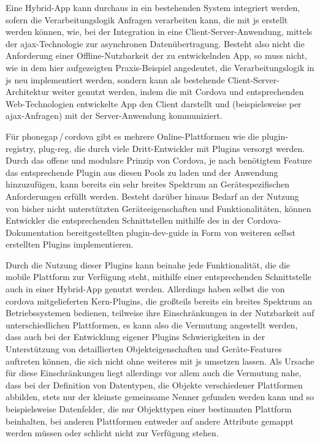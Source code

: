 
Eine Hybrid-App kann durchaus in ein bestehenden System integriert werden, sofern die Verarbeitungslogik Anfragen verarbeiten kann, die mit \gls{js} erstellt werden können, wie, \zB bei der Integration in eine Client-Server-Anwendung, mittels der \gls{ajax}-Technologie zur asynchronen Datenübertragung.
Besteht also nicht die Anforderung einer Offline-Nutzbarkeit der zu entwickelnden App, so muss nicht, wie in dem hier aufgezeigten Praxis-Beispiel angedeutet, die Verarbeitungslogik in \gls{js} neu implementiert werden, sondern kann als bestehende Client-Server-Architektur weiter genutzt werden, indem die mit Cordova und entsprechenden Web-Technologien entwickelte App den Client darstellt und (beispielsweise per \gls{ajax}-Anfragen) mit der Server-Anwendung kommuniziert.


Für \gls{phonegap}\,/\,\gls{cordova} gibt es mehrere Online-Plattformen wie die \gls{plugin-registry}, \gls{plug-reg}, die durch viele Dritt-Entwickler mit Plugins versorgt werden.
Durch das offene und modulare Prinzip von Cordova, je nach benötigtem Feature das entsprechende Plugin aus diesen Pools zu laden und der Anwendung hinzuzufügen, kann bereits ein sehr breites Spektrum an Gerätespezifischen Anforderungen erfüllt werden.
Besteht darüber hinaus Bedarf an der Nutzung von bisher nicht unterstützten Geräteeigenschaften und Funktionalitäten, können Entwickler die entsprechenden Schnittstellen mithilfe des in der Cordova-Dokumentation bereitgestellten \gls{plugin-dev-guide} in Form von weiteren selbst erstellten Plugins implementieren. 


Durch die Nutzung dieser Plugins kann beinahe jede Funktionalität, die die mobile Plattform zur Verfügung steht, mithilfe einer entsprechenden Schnittstelle auch in einer Hybrid-App genutzt werden.
Allerdings haben selbst die von \gls{cordova} mitgelieferten Kern-Plugins, die großteils bereits ein breites Spektrum an Betriebssystemen bedienen, teilweise ihre Einschränkungen in der Nutzbarkeit auf unterschiedlichen Plattformen, es kann also die Vermutung angestellt werden, dass auch bei der Entwicklung eigener Plugins Schwierigkeiten in der Unterstützung von detaillierten Objekteigenschaften und Geräte-Features auftreten können, die sich nicht ohne weiteres mit \gls{js} umsetzen lassen. 
Als Ursache für diese Einschränkungen liegt allerdings vor allem auch die Vermutung nahe, dass bei der Definition von Datentypen, die Objekte verschiedener Plattformen abbilden, stets nur der kleinste gemeinsame Nenner gefunden werden kann und so beispielsweise Datenfelder, die nur Objekttypen einer bestimmten Plattform beinhalten, bei anderen Plattformen entweder auf andere Attribute gemappt werden müssen oder schlicht nicht zur Verfügung stehen. 

